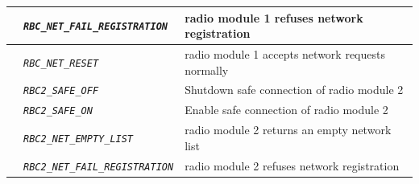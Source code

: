 \documentclass{template/openetcs}
\begin{document}
\begin{itemize}
\begin{longtable}{|l|l|l|}
				\hline
				
				&	\begin{minipage}[t]{0.40\linewidth} \emph{\texttt{RBC\_NET\_FAIL\_REGISTRATION}} \end{minipage}
				&	\begin{minipage}[t]{0.38\linewidth} radio module 1 refuses network registration \end{minipage} \\ 
				
				\hline
				
				&	\begin{minipage}[t]{0.40\linewidth} \emph{\texttt{RBC\_NET\_RESET}} \end{minipage}
				&	\begin{minipage}[t]{0.38\linewidth} radio module 1 accepts network requests normally \end{minipage} \\
				
				\hline
				
				&	\begin{minipage}[t]{0.40\linewidth} \emph{\texttt{RBC2\_SAFE\_OFF}} \end{minipage}
				&	\begin{minipage}[t]{0.38\linewidth} Shutdown safe connection of radio module 2 \end{minipage} \\ 
				
				\hline
				
				&	\begin{minipage}[t]{0.40\linewidth} \emph{\texttt{RBC2\_SAFE\_ON}} \end{minipage}
				&	\begin{minipage}[t]{0.38\linewidth} Enable safe connection of radio module 2 \end{minipage} \\
				
				\hline 
				
				&	\begin{minipage}[t]{0.40\linewidth} \emph{\texttt{RBC2\_NET\_EMPTY\_LIST}} \end{minipage}
				&	\begin{minipage}[t]{0.38\linewidth} radio module 2 returns an empty network list \end{minipage} \\
				
				\hline
				
				&	\begin{minipage}[t]{0.40\linewidth} \emph{\texttt{RBC2\_NET\_FAIL\_REGISTRATION}} \end{minipage}
				&	\begin{minipage}[t]{0.38\linewidth} radio module 2 refuses network registration \end{minipage} \\
				

\end{longtable}
\end{itemize}
\end{document}
